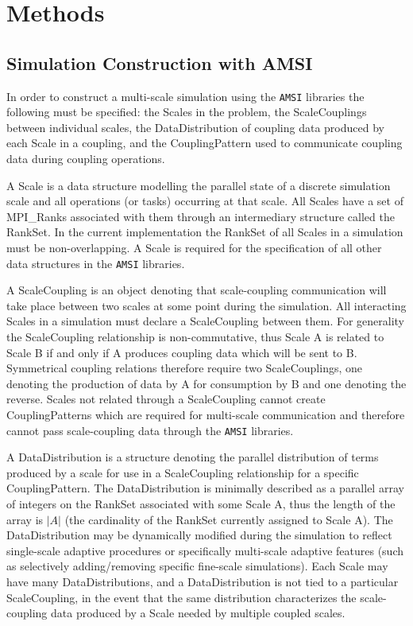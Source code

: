 \documentclass[11pt]{article}
\begin{document}
\section{Methods}\label{methods}

\subsection{Simulation Construction with AMSI}
In order to construct a multi-scale simulation using the \verb|AMSI| libraries the following must be specified: the Scales in the problem, the ScaleCouplings between individual scales, the DataDistribution of coupling data produced by each Scale in a coupling, and the CouplingPattern used to communicate coupling data during coupling operations.

A Scale is a data structure modelling the parallel state of a discrete simulation scale and all operations (or tasks) occurring at that scale.
All Scales have a set of MPI\_Ranks associated with them through an intermediary structure called the RankSet.
In the current implementation the RankSet of all Scales in a simulation must be non-overlapping.
A Scale is required for the specification of all other data structures in the \verb|AMSI| libraries.

A ScaleCoupling is an object denoting that scale-coupling communication will take place between two scales at some point during the simulation.
All interacting Scales in a simulation must declare a ScaleCoupling between them.
For generality the ScaleCoupling relationship is non-commutative, thus Scale A is related to Scale B if and only if A produces coupling data which will be sent to B.
Symmetrical coupling relations therefore require two ScaleCouplings, one denoting the production of data by A for consumption by B and one denoting the reverse.
Scales not related through a ScaleCoupling cannot create CouplingPatterns which are required for multi-scale communication and therefore cannot pass scale-coupling data through the \verb|AMSI| libraries.

A DataDistribution is a structure denoting the parallel distribution of terms produced by a scale for use in a ScaleCoupling relationship for a specific CouplingPattern.
The DataDistribution is minimally described as a parallel array of integers on the RankSet associated with some Scale A, thus the length of the array is $|A|$ (the cardinality of the RankSet currently assigned to Scale A).
The DataDistribution may be dynamically modified during the simulation to reflect single-scale adaptive procedures or specifically multi-scale adaptive features (such as selectively adding/removing specific fine-scale simulations).
Each Scale may have many DataDistributions, and a DataDistribution is not tied to a particular ScaleCoupling, in the event that the same distribution characterizes the scale-coupling data produced by a Scale needed by multiple coupled scales.
\end{document}
